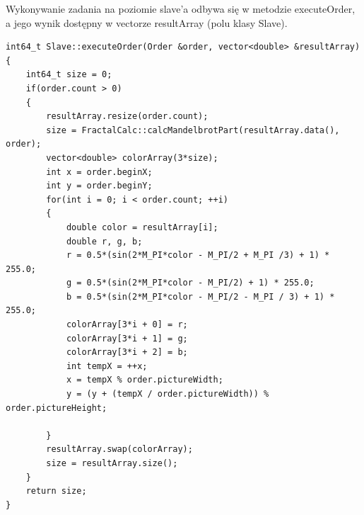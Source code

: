 \documentclass[a4paper]{article}
\begin{document}
Wykonywanie zadania na poziomie slave'a odbywa się w metodzie executeOrder, a jego wynik dostępny w vectorze resultArray (polu klasy Slave).
\begin{lstlisting}
int64_t Slave::executeOrder(Order &order, vector<double> &resultArray)
{
	int64_t size = 0;
	if(order.count > 0)
	{
	    resultArray.resize(order.count);
	    size = FractalCalc::calcMandelbrotPart(resultArray.data(), order);
	    vector<double> colorArray(3*size);
	    int x = order.beginX;
	    int y = order.beginY;
	    for(int i = 0; i < order.count; ++i)
    	{
        	double color = resultArray[i];
        	double r, g, b;
    	    r = 0.5*(sin(2*M_PI*color - M_PI/2 + M_PI /3) + 1) * 255.0;
    	    g = 0.5*(sin(2*M_PI*color - M_PI/2) + 1) * 255.0;
    		b = 0.5*(sin(2*M_PI*color - M_PI/2 - M_PI / 3) + 1) * 255.0;
            colorArray[3*i + 0] = r;
            colorArray[3*i + 1] = g;
            colorArray[3*i + 2] = b;
			int tempX = ++x;
			x = tempX % order.pictureWidth;
			y = (y + (tempX / order.pictureWidth)) % order.pictureHeight;

    	}
	    resultArray.swap(colorArray);
	    size = resultArray.size();
	}
    return size;
}
\end{lstlisting}
\end{document}
